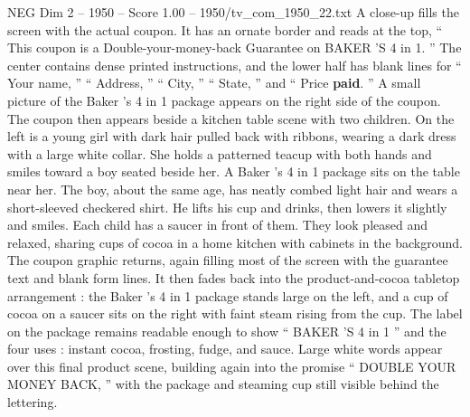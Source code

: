 \begin{textsample}{NEG Dim 2 – 1950 – Score 1.00 – 1950/tv\_com\_1950\_22.txt}
A close-up fills the screen with the actual coupon.
It has an ornate border and reads at the top, “ This coupon is a Double-your-money-back Guarantee on BAKER ’S 4 in 1. ” The center contains dense printed instructions, and the lower half has blank lines for “ Your name, ” “ Address, ” “ City, ” “ State, ” and “ Price \textbf{paid}. ” A small picture of the Baker ’s 4 in 1 package appears on the right side of the coupon.
The coupon then appears beside a kitchen table scene with two children.
On the left is a young girl with dark hair pulled back with ribbons, wearing a dark dress with a large white collar.
She holds a patterned teacup with both hands and smiles toward a boy seated beside her.
A Baker ’s 4 in 1 package sits on the table near her.
The boy, about the same age, has neatly combed light hair and wears a short-sleeved checkered shirt.
He lifts his cup and drinks, then lowers it slightly and smiles.
Each child has a saucer in front of them.
They look pleased and relaxed, sharing cups of cocoa in a home kitchen with cabinets in the background.
The coupon graphic returns, again filling most of the screen with the guarantee text and blank form lines.
It then fades back into the product-and-cocoa tabletop arrangement : the Baker ’s 4 in 1 package stands large on the left, and a cup of cocoa on a saucer sits on the right with faint steam rising from the cup.
The label on the package remains readable enough to show “ BAKER ’S 4 in 1 ” and the four uses : instant cocoa, frosting, fudge, and sauce.
Large white words appear over this final product scene, building again into the promise “ DOUBLE YOUR MONEY BACK, ” with the package and steaming cup still visible behind the lettering.

\end{textsample}
